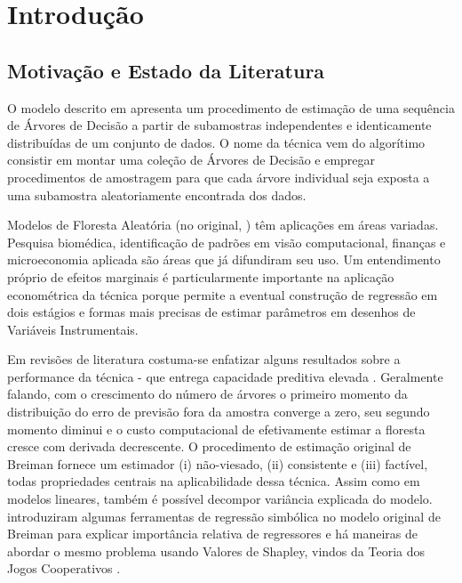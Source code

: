 

\chapter{Introdução}
\label{cap:intro} %
\section{Motivação e Estado da Literatura}

O modelo descrito em  apresenta um procedimento de estimação de uma sequência de Árvores de Decisão a partir de subamostras independentes e identicamente distribuídas de um conjunto de dados. O nome da técnica vem do algorítimo consistir em montar uma coleção de Árvores de Decisão e empregar procedimentos de amostragem para que cada árvore individual seja exposta a uma subamostra aleatoriamente encontrada dos dados.

Modelos de Floresta Aleatória (no original, ) têm aplicações em áreas variadas. Pesquisa biomédica, identificação de padrões em visão computacional, finanças e microeconomia aplicada são áreas que já difundiram seu uso. Um entendimento próprio de efeitos marginais é particularmente importante na aplicação econométrica da técnica porque permite a eventual construção de regressão em dois estágios e formas mais precisas de estimar parâmetros em desenhos de Variáveis Instrumentais.

Em revisões de literatura \cite{siroky2009navigating, biau2016random} costuma-se enfatizar alguns resultados sobre a performance da técnica - que entrega capacidade preditiva elevada \cite{gu2018empirical}. Geralmente falando, com o crescimento do número de árvores o primeiro momento da distribuição do erro de previsão fora da amostra converge a zero, seu segundo momento diminui e o custo computacional de efetivamente estimar a floresta cresce com derivada decrescente. O procedimento de estimação original de Breiman fornece um estimador (i) não-viesado, (ii) consistente e (iii) factível, todas propriedades centrais na aplicabilidade dessa técnica. Assim como em modelos lineares, também é possível decompor variância explicada do modelo.  introduziram algumas ferramentas de regressão simbólica no modelo original de Breiman para explicar importância relativa de regressores e há maneiras de abordar o mesmo problema usando Valores de Shapley, vindos da Teoria dos Jogos Cooperativos \cite{cohen2007feature}.


